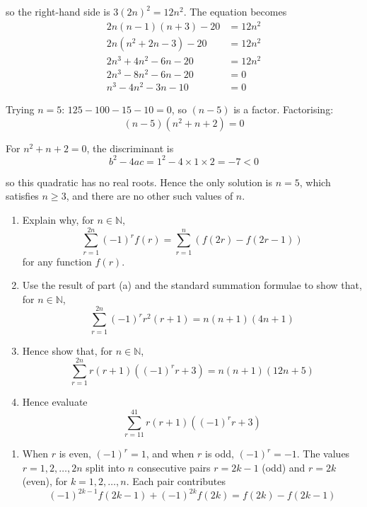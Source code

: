 \documentclass[leqno]{article}
\begin{document}
\begin{enumerate}[
  label=\textbf{\arabic*.},
  leftmargin=*,
  topsep=0pt,
  partopsep=0pt,
  parsep=0pt
]
\begin{djsSolution}
\begin{enumerate}[label=\textbf{(\alph*)}, start=1]
so the right-hand side is \(3(2n)^2=12n^2\). The equation becomes
\begin{align*}
2n(n-1)(n+3)-20&=12n^2\\
2n\left(n^2+2n-3\right)-20&=12n^2\\
2n^3+4n^2-6n-20&=12n^2\\
2n^3-8n^2-6n-20&=0\\
n^3-4n^2-3n-10&=0
\end{align*}

Trying \(n=5\): \(125-100-15-10=0\), so \((n-5)\) is a factor. Factorising:
\[
(n-5)\left(n^2+n+2\right)=0
\]

For \(n^2+n+2=0\), the discriminant is
\[
b^2-4ac=1^2-4\times1\times2=-7<0
\]

so this quadratic has no real roots. Hence the only solution is \(n=5\), which satisfies \(n\geq3\), and there are no other such values of \(n\).
\end{enumerate}
\end{djsSolution}

\newpage

\questionitem

\begin{enumerate}[label=\textbf{(\alph*)}]
  \item Explain why, for $n \in \mathbb{N}$,
  \[\sum_{r=1}^{2n} (-1)^r f(r) = \sum_{r=1}^{n} \left(f(2r) - f(2r-1)\right)\]
  for any function $f(r)$.  \\
  \item Use the result of part (a) and the standard summation formulae to show that, for $n \in \mathbb{N}$,
  \[\sum_{r=1}^{2n} (-1)^r r^2(r+1) = n(n+1)(4n+1)\] 
  \item Hence show that, for $n \in \mathbb{N}$,
  \[\sum_{r=1}^{2n} r(r+1)\left((-1)^r r + 3\right) = n(n+1)(12n+5)\] 
  \item Hence evaluate
  \[\sum_{r=11}^{41} r(r+1)\left((-1)^r r + 3\right)\] 
\end{enumerate}

\vspace*{10pt}

\begin{djsSolution}
\begin{enumerate}[label=\textbf{(\alph*)}, start=1]
  \item When \(r\) is even, \((-1)^r=1\), and when \(r\) is odd, \((-1)^r=-1\). The values \(r=1,2,\ldots,2n\) split into \(n\) consecutive pairs \(r=2k-1\) (odd) and \(r=2k\) (even), for \(k=1,2,\ldots,n\). Each pair contributes
\[
(-1)^{2k-1}f(2k-1)+(-1)^{2k}f(2k)=f(2k)-f(2k-1)
\]


\end{enumerate}
\end{djsSolution}
\end{enumerate}
\end{document}
